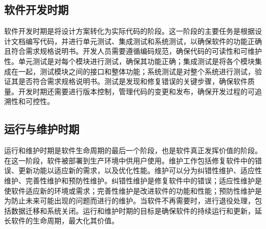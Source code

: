 \subsection{软件开发时期}

软件开发时期是将设计方案转化为实际代码的阶段。这一阶段的主要任务是根据设计文档编写代码，并进行单元测试、集成测试和系统测试，以确保软件的功能正确且符合需求规格说明书。开发人员需要遵循编码规范，确保代码的可读性和可维护性。单元测试是对每个模块进行测试，确保其功能正确；集成测试是将各个模块集成在一起，测试模块之间的接口和整体功能；系统测试是对整个系统进行测试，验证其是否符合需求规格说明书。测试是发现和修复错误的关键步骤，确保软件质量。开发时期还需要进行版本控制，管理代码的变更和发布，确保开发过程的可追溯性和可控性。

\subsection{运行与维护时期}

运行和维护时期是软件生命周期的最后一个阶段，也是软件真正发挥价值的阶段。在这一阶段，软件被部署到生产环境中供用户使用。维护工作包括修复软件中的错误、更新功能以适应新的需求，以及优化性能。维护可以分为纠错性维护、适应性维护、完善性维护和预防性维护。纠错性维护是修复软件中的错误；适应性维护是使软件适应新的环境或需求；完善性维护是改进软件的功能和性能；预防性维护是为防止未来可能出现的问题而进行的维护。当软件不再需要时，进行退役处理，包括数据迁移和系统关闭。运行和维护时期的目标是确保软件的持续运行和更新，延长软件的生命周期，最大化其价值。

